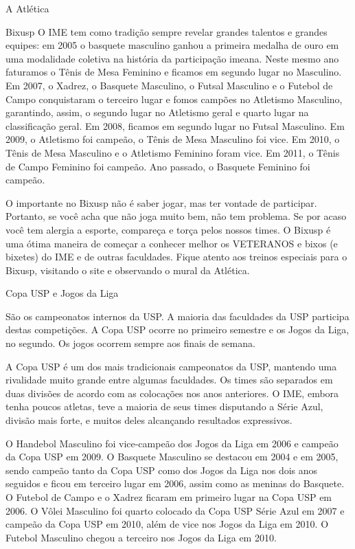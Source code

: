 \begin{secao}{A Atlética}
\begin{subsecao}{Bixusp}
O IME tem como tradição sempre revelar grandes talentos e grandes equipes: em
2005 o basquete masculino ganhou a primeira medalha de ouro em uma modalidade
coletiva na história da participação imeana. Neste mesmo ano faturamos o Tênis
de Mesa Feminino e ficamos em segundo lugar no Masculino. Em 2007, o Xadrez, o 
Basquete Masculino, o Futsal Masculino e o Futebol de Campo conquistaram o 
terceiro lugar e fomos campões no Atletismo Masculino, garantindo, assim, o 
segundo lugar no Atletismo geral e quarto lugar na classificação geral. Em 2008,
ficamos em segundo lugar no Futsal Masculino. Em 2009, o Atletismo foi campeão, 
o Tênis de Mesa Masculino foi vice. Em 2010, o Tênis de Mesa Masculino e o 
Atletismo Feminino foram vice. Em 2011, o Tênis de Campo Feminino foi campeão. 
Ano passado, o Basquete Feminino foi campeão.

O importante no Bixusp não é saber jogar, mas ter vontade de participar.
Portanto, se você acha que não joga muito bem, não tem problema. Se por acaso
você tem alergia a esporte, compareça e torça pelos nossos times. O Bixusp é uma
ótima maneira de começar a conhecer melhor os VETERANOS e bixos (e bixetes) do
IME e de outras faculdades. Fique atento aos treinos especiais para o Bixusp, 
visitando o site e observando o mural da Atlética.

\end{subsecao}
\begin{subsecao}{Copa USP e Jogos da Liga}

São os campeonatos internos da USP. A maioria das faculdades da USP participa
destas competições. A Copa USP ocorre no primeiro semestre e os Jogos da Liga,
no segundo. Os jogos ocorrem sempre aos finais de semana.

A Copa USP é um dos mais tradicionais campeonatos da USP, mantendo uma
rivalidade muito grande entre algumas faculdades. Os times são separados em
duas divisões de acordo com as colocações nos anos anteriores. O IME, embora
tenha poucos atletas, teve a maioria de seus times disputando a Série Azul,
divisão mais forte, e muitos deles alcançando resultados expressivos.

O Handebol Masculino foi vice-campeão dos Jogos da Liga em 2006 e campeão da
Copa USP em 2009. O Basquete Masculino se destacou em 2004 e em 2005, sendo
campeão tanto da Copa USP como dos Jogos da Liga nos dois anos seguidos e ficou
em terceiro lugar em 2006, assim como as meninas do Basquete. O Futebol de
Campo e o Xadrez ficaram em primeiro lugar na Copa USP em 2006. O Vôlei
Masculino foi quarto colocado da Copa USP Série Azul em 2007 e campeão da Copa
USP em 2010, além de vice nos Jogos da Liga em 2010. O Futebol Masculino chegou
a terceiro nos Jogos da Liga em 2010.


\end{subsecao}
\end{secao}

